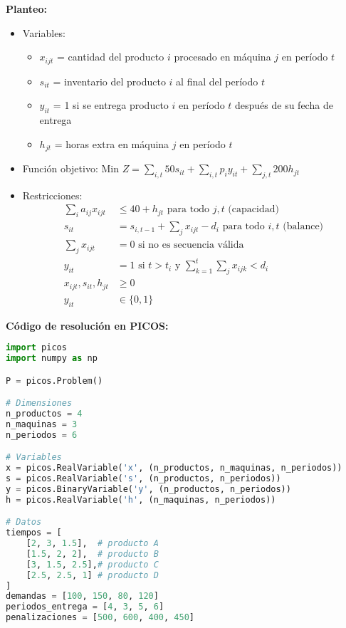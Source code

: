 \documentclass[12pt]{article}
\begin{document}
\begin{enumerate}
\textbf{Planteo:}
\begin{itemize}
\item Variables:
  \begin{itemize}
  \item $x_{ijt}$ = cantidad del producto $i$ procesado en máquina $j$ en período $t$
  \item $s_{it}$ = inventario del producto $i$ al final del período $t$
  \item $y_{it}$ = 1 si se entrega producto $i$ en período $t$ después de su fecha de entrega
  \item $h_{jt}$ = horas extra en máquina $j$ en período $t$
  \end{itemize}
\item Función objetivo: Min $Z = \sum_{i,t} 50s_{it} + \sum_{i,t} p_iy_{it} + \sum_{j,t} 200h_{jt}$
\item Restricciones:
  \begin{align*}
  \sum_{i} a_{ij}x_{ijt} &\leq 40 + h_{jt} \text{ para todo } j,t \text{ (capacidad)} \\
  s_{it} &= s_{i,t-1} + \sum_j x_{ijt} - d_i \text{ para todo } i,t \text{ (balance)} \\
  \sum_j x_{ijt} &= 0 \text{ si no es secuencia válida} \\
  y_{it} &= 1 \text{ si } t > t_i \text{ y } \sum_{k=1}^t \sum_j x_{ijk} < d_i \\
  x_{ijt}, s_{it}, h_{jt} &\geq 0 \\
  y_{it} &\in \{0,1\}
  \end{align*}
\end{itemize}

\textbf{Código de resolución en PICOS:}
\begin{lstlisting}[language=Python]
import picos
import numpy as np

P = picos.Problem()

# Dimensiones
n_productos = 4
n_maquinas = 3
n_periodos = 6

# Variables
x = picos.RealVariable('x', (n_productos, n_maquinas, n_periodos))
s = picos.RealVariable('s', (n_productos, n_periodos))
y = picos.BinaryVariable('y', (n_productos, n_periodos))
h = picos.RealVariable('h', (n_maquinas, n_periodos))

# Datos
tiempos = [
    [2, 3, 1.5],  # producto A
    [1.5, 2, 2],  # producto B
    [3, 1.5, 2.5],# producto C
    [2.5, 2.5, 1] # producto D
]
demandas = [100, 150, 80, 120]
periodos_entrega = [4, 3, 5, 6]
penalizaciones = [500, 600, 400, 450]


\end{lstlisting}
\end{enumerate}
\end{document}
